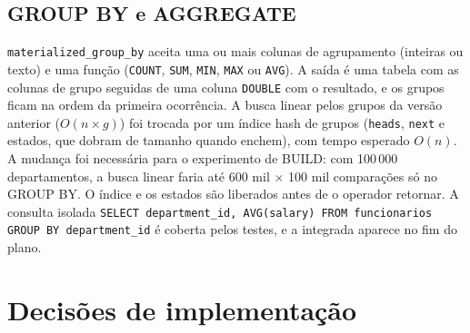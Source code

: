 \documentclass[11pt,a4paper]{article}
\begin{document}
\subsection{GROUP BY e AGGREGATE}
\texttt{materialized\_group\_by} aceita uma ou mais colunas de agrupamento (inteiras ou texto) e uma função (\texttt{COUNT}, \texttt{SUM}, \texttt{MIN}, \texttt{MAX} ou \texttt{AVG}). A saída é uma tabela com as colunas de grupo seguidas de uma coluna \texttt{DOUBLE} com o resultado, e os grupos ficam na ordem da primeira ocorrência. A busca linear pelos grupos da versão anterior ($O(n \times g)$) foi trocada por um índice hash de grupos (\texttt{heads}, \texttt{next} e estados, que dobram de tamanho quando enchem), com tempo esperado $O(n)$. A mudança foi necessária para o experimento de BUILD: com 100\,000 departamentos, a busca linear faria até 600 mil $\times$ 100 mil comparações só no GROUP BY. O índice e os estados são liberados antes de o operador retornar. A consulta isolada \texttt{SELECT department\_id, AVG(salary) FROM funcionarios GROUP BY department\_id} é coberta pelos testes, e a integrada aparece no fim do plano.

\section{Decisões de implementação}
\end{document}
